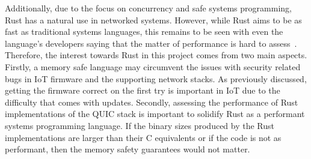 Additionally, due to the focus on concurrency and safe systems programming, Rust has a natural use in networked systems.
However, while Rust aims to be as fast as traditional systems languages, this remains to be seen with even the language's developers saying that the matter of performance is hard to assess~\cite{rust_faq_2021}. Therefore, the interest towards Rust in this project comes from two main aspects.
Firstly, a memory safe language may circumvent the issues with security related bugs in IoT firmware and the supporting network stacks.
As previously discussed, getting the firmware correct on the first try is important in IoT due to the difficulty that comes with updates.
Secondly, assessing the performance of Rust implementations of the QUIC stack is important to solidify Rust as a performant systems programming language.
If the binary sizes produced by the Rust implementations are larger than their C equivalents or if the code is not as performant, then the memory safety guarantees would not matter.